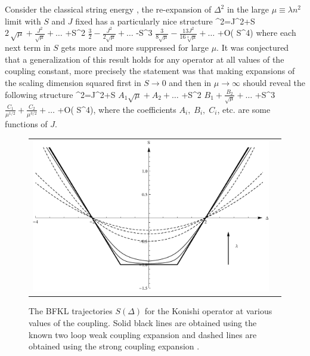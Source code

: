 Consider the classical string energy , the re-expansion of $\Delta^2$ in the large $\mu \equiv \lambda n^2$ limit with $S$ and $J$ fixed has a particularly nice structure
\beq
\Delta^2=J^2+S
\(
2\, \sqrt{\mu}+\frac{J^2}{\sqrt{\mu}}+\dots%
\)
+S^2
\(
\frac{3}{2}-\frac{J^2}{2\sqrt{\mu}}
+\dots%
\)
-S^3
\(
\frac{3}{8\sqrt{\mu}}
-\frac{13 J^2}{16\sqrt[3]{\mu}}
+\dots
\)
+{\cal O}({ S}^4)
\label{dsquare_tree}
\eeq
where each next term in $S$ gets more and more suppressed for large $\mu$. 
It was conjectured \cite{Basso:2011rs} that a generalization of this result holds for any operator at all values of the coupling constant, more precisely the statement was that making expansions of the scaling dimension squared first in $S\to 0$ and then in $\mu\to \infty$ should reveal the following structure
\beq\label{eq:delta_squared_basso}
\Delta^2=J^2+S
\(
A_1\sqrt{\mu}+A_2+\dots
\)
+S^2
\(
B_1+\frac{B_2}{\sqrt\mu}
+\dots%
\)
+S^3
\(
\frac{C_1}{\mu^{1/2}}
+\frac{C_2}{\mu^{3/2}}
+\dots
\)
+{\cal O}({ S}^4)\;,
\eeq
where the coefficients $A_i,\;B_i,\;C_i$, etc. are some functions of $J$.

\begin{figure}[t]
    \begin{tabular}{cc}
    \includegraphics[scale=0.7]{../graphics/bfkl}
    \end{tabular}
\caption{The BFKL trajectories $S(\Delta)$ for the Konishi operator at various values of the coupling. Solid black lines are obtained using the known two loop weak coupling expansion \cite{Brower:2006ea,Kotikov:2002ab} and dashed lines are obtained using the strong coupling expansion \cite{Costa:2012cb,Kotikov:2013xu,Brower:2013jga}.}
\label{fig:bfkl}
\end{figure}

